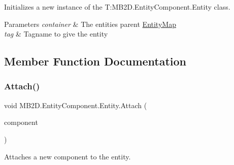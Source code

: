 Initializes a new instance of the T\+:\+M\+B2\+D.\+Entity\+Component.\+Entity class. 


\begin{DoxyParams}{Parameters}
{\em container} & The entities parent \hyperlink{class_m_b2_d_1_1_entity_component_1_1_entity_map}{Entity\+Map}\\
\hline
{\em tag} & Tagname to give the entity\\
\hline
\end{DoxyParams}


\subsection{Member Function Documentation}
\hypertarget{class_m_b2_d_1_1_entity_component_1_1_entity_aa86d1be62df6d89b981d1000c856a306}{}\label{class_m_b2_d_1_1_entity_component_1_1_entity_aa86d1be62df6d89b981d1000c856a306} 
\subsubsection{\texorpdfstring{Attach()}{Attach()}}
{\footnotesize\ttfamily void M\+B2\+D.\+Entity\+Component.\+Entity.\+Attach (\begin{DoxyParamCaption}\item[{\hyperlink{interface_m_b2_d_1_1_entity_component_1_1_i_component}{I\+Component}}]{component }\end{DoxyParamCaption})\hspace{0.3cm}{\ttfamily [inline]}}



Attaches a new component to the entity. 


